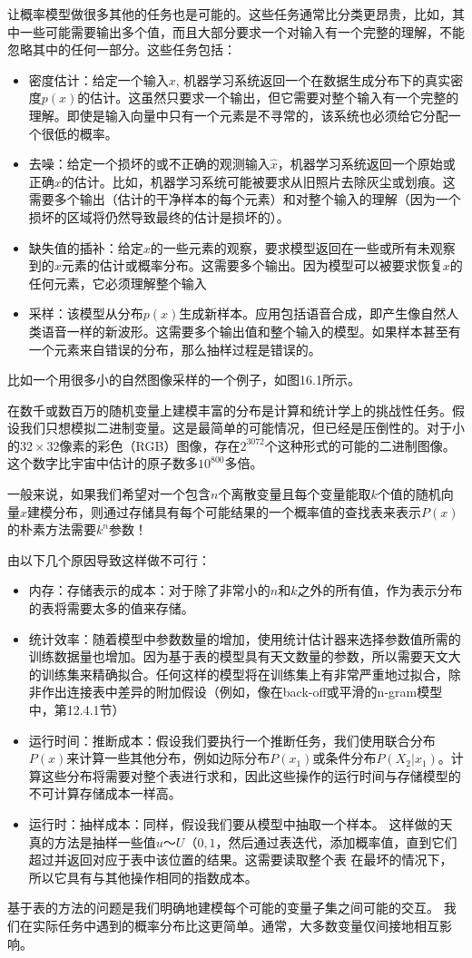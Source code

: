 让概率模型做很多其他的任务也是可能的。这些任务通常比分类更昂贵，比如，其中一些可能需要输出多个值，而且大部分要求一个对输入有一个完整的理解，不能忽略其中的任何一部分。这些任务包括：
\begin{itemize}
\item 密度估计：给定一个输入$x$, 机器学习系统返回一个在数据生成分布下的真实密度$p(x)$的估计。这虽然只要求一个输出，但它需要对整个输入有一个完整的理解。即使是输入向量中只有一个元素是不寻常的，该系统也必须给它分配一个很低的概率。
\item 去噪：给定一个损坏的或不正确的观测输入$\hat{x}$，机器学习系统返回一个原始或正确$x$的估计。比如，机器学习系统可能被要求从旧照片去除灰尘或划痕。这需要多个输出（估计的干净样本的每个元素）和对整个输入的理解（因为一个损坏的区域将仍然导致最终的估计是损坏的）。
\item 缺失值的插补：给定$x$的一些元素的观察，要求模型返回在一些或所有未观察到的$x$元素的估计或概率分布。这需要多个输出。因为模型可以被要求恢复$x$的任何元素，它必须理解整个输入
\item 采样：该模型从分布$p(x)$生成新样本。应用包括语音合成，即产生像自然人类语音一样的新波形。这需要多个输出值和整个输入的模型。如果样本甚至有一个元素来自错误的分布，那么抽样过程是错误的。
\end{itemize}

比如一个用很多小的自然图像采样的一个例子，如图16.1所示。

在数千或数百万的随机变量上建模丰富的分布是计算和统计学上的挑战性任务。假设我们只想模拟二进制变量。这是最简单的可能情况，但已经是压倒性的。对于小的$32×32$像素的彩色（RGB）图像，存在$2^3072$个这种形式的可能的二进制图像。这个数字比宇宙中估计的原子数多$10^800$多倍。

一般来说，如果我们希望对一个包含$n$个离散变量且每个变量能取$k$个值的随机向量$x$建模分布，则通过存储具有每个可能结果的一个概率值的查找表来表示$P(x)$的朴素方法需要$k^n$参数！

由以下几个原因导致这样做不可行：
\begin{itemize}
\item 内存：存储表示的成本：对于除了非常小的$n$和$k$之外的所有值，作为表示分布的表将需要太多的值来存储。
\item 统计效率：随着模型中参数数量的增加，使用统计估计器来选择参数值所需的训练数据量也增加。因为基于表的模型具有天文数量的参数，所以需要天文大的训练集来精确拟合。任何这样的模型将在训练集上有非常严重地过拟合，除非作出连接表中差异的附加假设（例如，像在back-off或平滑的n-gram模型中，第12.4.1节）
\item 运行时间：推断成本：假设我们要执行一个推断任务，我们使用联合分布$P(x)$来计算一些其他分布，例如边际分布$P(x_1)$或条件分布$P(X_2|x_1)$。计算这些分布将需要对整个表进行求和，因此这些操作的运行时间与存储模型的不可计算存储成本一样高。
\item 运行时：抽样成本：同样，假设我们要从模型中抽取一个样本。 这样做的天真的方法是抽样一些值$u〜U（0,1$，然后通过表迭代，添加概率值，直到它们超过并返回对应于表中该位置的结果。这需要读取整个表 在最坏的情况下，所以它具有与其他操作相同的指数成本。
\end{itemize}

基于表的方法的问题是我们明确地建模每个可能的变量子集之间可能的交互。 我们在实际任务中遇到的概率分布比这更简单。通常，大多数变量仅间接地相互影响。




